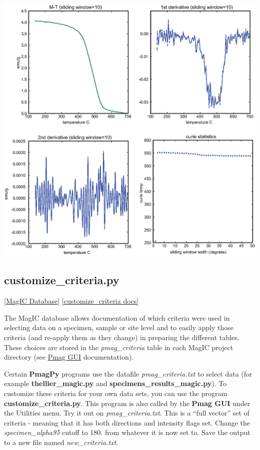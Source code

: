 \documentclass[11pt]{book}
\begin{document}
{{%
{%
  \includegraphics[width=14.5 cm]{EPSfiles/curie-ex.eps}}


\subsection{customize\_criteria.py}
\href{#MagICDatabase}{[MagIC Database]}
\href{https://github.com/PmagPy/PmagPy/blob/master/programs/customize_criteria.py}{[customize\_criteria docs]}

The MagIC database allows documentation of which criteria were used in selecting data on a specimen, sample or site level and to easily apply those criteria (and re-apply them as they change) in preparing the different tables.  These choices are stored in the {\it pmag\_criteria} table in each MagIC project directory (see \href{#pmag_gui.py}{Pmag GUI} documentation).

 Certain {\bf PmagPy} programs use the datafile {\it pmag\_criteria.txt} to select data (for example {\bf thellier\_magic.py} and {\bf specimens\_results\_magic.py}).  To customize these criteria for your own data sets, you can use the program {\bf customize\_criteria.py}.  This program is also called by the {\bf Pmag GUI} under the Utilities menu.    Try it out on {\it pmag\_criteria.txt}.   This is a ``full vector'' set of criteria - meaning that it has both directions and intensity flags set.  Change the {\it specimen\_alpha95} cutoff to 180. from whatever it is now set to.   Save the output to a new file named {\it new\_criteria.txt}.

}}
\end{document}
